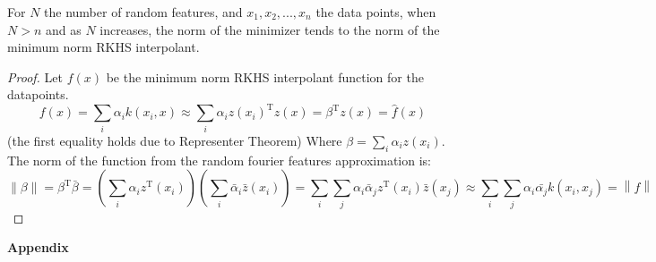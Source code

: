 \documentclass[english]{article}
\newcommand\norm[1]{\left\lVert#1\right\rVert}
\begin{document}
\begin{thm} \label{thm:RFFnorm}
	For $N$ the number of random features, and $x_1, x_2, ..., x_n$ the data points, when $N > n$ and as $N$ increases, the norm of the minimizer tends to  the norm of the minimum norm RKHS interpolant.
\end{thm}
\begin{proof}
Let $f(x)$ be the minimum norm RKHS interpolant function for the datapoints. 
\[f(x) = \sum_{i}\alpha_ik(x_i, x) \approx \sum_{i}\alpha_iz(x_i)^\text{T}z(x) 
 = \beta^\text{T}z(x) = \hat{f}(x)
\] (the first equality holds due to Representer Theorem)
Where $\beta = \sum_{i}\alpha_iz(x_i) $.
The norm of the function from the random fourier features approximation is:
\[ \norm{\beta} =   \beta^\text{T} \bar{\beta} = 
(\sum_{i}\alpha_i z^\text{T}(x_i)) (\sum_{i}\bar{\alpha}_i\bar{z}(x_i)) 
= \sum_i \sum_j \alpha_i \bar{\alpha}_j z^\text{T}(x_i)\bar{z}(x_j)  
\approx \sum_i \sum_j \alpha_i \bar{ \alpha_j} k(x_i, x_j)
= \norm{f}
\]
\end{proof}
\newpage



\newpage
{\huge \centering \bf Appendix \par}

\appendix
\end{document}
